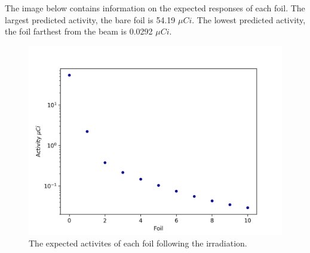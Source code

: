 \documentclass{amsart}
\theoremstyle{definition}
\begin{document}
The image below contains information on the expected responses of each foil.
The largest predicted activity, the bare foil is 54.19 $\mu Ci$.
The lowest predicted activity, the foil farthest from the beam is 0.0292 $\mu Ci$.

\begin{figure}[!htb]
\includegraphics[width=0.8\linewidth]{../response/plot/ft_au_theoretical_responses.png}
\caption{The expected activites of each foil following the irradiation.}
\end{figure}
\end{document}
